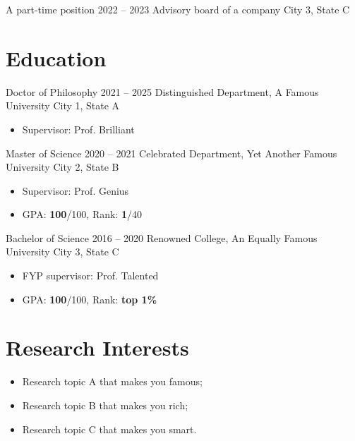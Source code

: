 \documentclass[a4paper,11pt]{article}
\begin{document}
\experience
	{A part-time position}
	{2022 -- 2023}
	{Advisory board of a company}
	{City 3, State C}{}


\section{Education}

\experience
	{Doctor of Philosophy}
	{2021 -- 2025}
	{Distinguished Department, A Famous University}
	{City 1, State A}
	{\begin{itemize}
		\item[-] Supervisor: Prof. Brilliant
	\end{itemize}}

\experience
	{Master of Science}
	{2020 -- 2021}
	{Celebrated Department, Yet Another Famous University}
	{City 2, State B}
	{\begin{itemize}
		\item[-] Supervisor: Prof. Genius
		\item[-] GPA: \textbf{100}/100, Rank: \textbf{1}/40
	\end{itemize}}

\experience
	{Bachelor of Science}
	{2016 -- 2020}
	{Renowned College, An Equally Famous University}
	{City 3, State C}
	{\begin{itemize}
		\item[-] FYP supervisor: Prof. Talented
		\item[-] GPA: \textbf{100}/100, Rank: \textbf{top 1\%}
	\end{itemize}}

\section{Research Interests}

\begin{text}
\begin{itemize}[leftmargin=1em]
	\item Research topic A that makes you famous;
	\item Research topic B that makes you rich;
	\item Research topic C that makes you smart.
\end{itemize}
\end{text}
\end{document}
